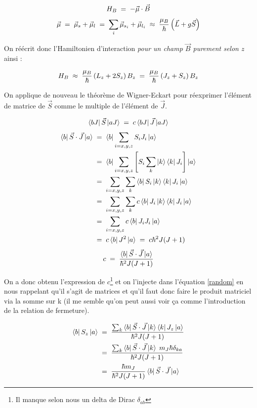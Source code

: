 \[
    H_B \; = \; -\vec{\mu} \cdot \vec{B}
\]
\[
    \vec{\mu} \; = \; \vec{\mu}_{s} + \vec{\mu}_{l} \; = \; \sum_i \vec{\mu}_{s_i} + \vec{\mu}_{l_i} \; \approx \; \dfrac{\mu_B}{\hbar}\left( \vec{L} + g\vec{S}\right)
\]

On réécrit donc l'Hamiltonien d'interaction \emph{pour un champ $\vec{B}$ purement selon $z$} ainsi :

\[
    H_B \;\approx\; \dfrac{\mu_B}{\hbar}\left( L_z + 2 S_z\right)B_z \; = \; \dfrac{\mu_B}{\hbar}\left( J_z + S_z\right)B_z
\]

On applique de nouveau le théorème de Wigner-Eckart pour réexprimer l'élément de matrice de $\vec{S}$ comme le multiple de l'élément de $\vec{J}$.

\begin{equation}
    \bra{bJ}\vec{S}\ket{aJ} \; = \; c \bra{bJ}\vec{J}\ket{aJ}
    \label{random}
\end{equation}
\begin{align*}
    \bra{b}\vec{S}\cdot\vec{J}\ket{a} 
    &\; = \; 
    \bra{b} \sum_{i=x,y,z}S_i J_i\ket{a} \\
    &\; = \; 
    \bra{b} \sum_{i=x,y,z} \left[ S_i \sum_k \ket{k}\bra{k} J_i \right] \ket{a} \\
    &\; = \; 
    \sum_{i=x,y,z} \sum_k \bra{b}S_i\ket{k} \bra{k}J_i\ket{a} \\
    &\; = \; 
    \sum_{i=x,y,z} \sum_k c\bra{b}J_i\ket{k} \bra{k}J_i\ket{a} \\
    &\; = \; 
    \sum_{i=x,y,z} c\bra{b}J_iJ_i\ket{a} \\
    &\; = \; 
    c\bra{b}J^2\ket{a} \; = \; c \hbar^2 J(J+1)
\end{align*}
\[
    c \; = \; \dfrac{\bra{b}\vec{S}\cdot\vec{J}\ket{a}}{\hbar^2 J(J+1)}
\]

On a donc obtenu l'expression de $c$\footnote{Il manque selon nous un delta de Dirac $\delta_{ab}$} et on l'injecte dans l'équation \ref{random} en nous rappelant qu'il s'agit de matrices et qu'il faut donc faire le produit matriciel via la somme sur k (il me semble qu'on peut aussi voir ça comme l'introduction de la relation de fermeture).

\begin{align*}
    \bra{b}S_z\ket{a} 
    &\; = \;  
    \dfrac{\sum_k \bra{b}\vec{S}\cdot\vec{J}\ket{k}\bra{k}J_z\ket{a}}{\hbar^2 J(J+1)}\\
     &\; = \;  
    \dfrac{\sum_k \bra{b}\vec{S}\cdot\vec{J} \ket{k} \; m_J\hbar \delta_{ka}}{\hbar^2 J(J+1)}\\
    &\; = \;  
    \dfrac{\hbar m_J}{\hbar^2 J(J+1)} \bra{b}\vec{S}\cdot\vec{J}\ket{a}
\end{align*}

